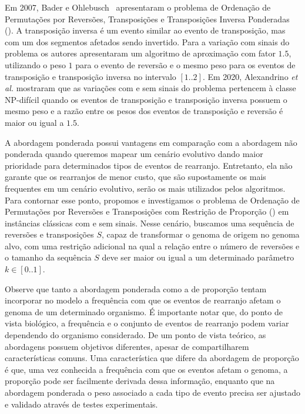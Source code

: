 Em 2007, Bader e Ohlebusch~\cite{2007-bader-ohlebusch} apresentaram o problema de Ordenação de Permutações por Reversões, Transposições e Transposições Inversa Ponderadas (\SbWRTIT). A transposição inversa é um evento similar ao evento de transposição, mas com um dos segmentos afetados sendo invertido. Para a variação com sinais do problema os autores apresentaram um algoritmo de aproximação com fator $1.5$, utilizando o peso $1$ para o evento de reversão e o mesmo peso para os eventos de transposição e transposição inversa no intervalo $[1..2]$. Em 2020, Alexandrino \textit{et al.}\cite{2020c-alexandrino-etal} mostraram que as variações com e sem sinais do problema \SbWRTIT{} pertencem à classe NP-difícil quando os eventos de transposição e transposição inversa possuem o mesmo peso e a razão entre os pesos dos eventos de transposição e reversão é maior ou igual a $1.5$.

A abordagem ponderada possui vantagens em comparação com a abordagem não ponderada quando queremos mapear um cenário evolutivo dando maior prioridade para determinados tipos de eventos de rearranjo. Entretanto, ela não garante que os rearranjos de menor custo, que são supostamente os mais frequentes em um cenário evolutivo, serão os mais utilizados pelos algoritmos. Para contornar esse ponto, propomos e investigamos o problema de Ordenação de Permutações por Reversões e Transposições com Restrição de Proporção (\SbPRT) em instâncias clássicas com e sem sinais. Nesse cenário, buscamos uma sequência de reversões e transposições $S$, capaz de transformar o genoma de origem no genoma alvo, com uma restrição adicional na qual a relação entre o número de reversões e o tamanho da sequência $S$ deve ser maior ou igual a um determinado parâmetro $k \in [0..1]$. 

Observe que tanto a abordagem ponderada como a de proporção tentam incorporar no modelo a frequência com que os eventos de rearranjo afetam o genoma de um determinado organismo. É importante notar que, do ponto de vista biológico, a frequência e o conjunto de eventos de rearranjo podem variar dependendo do organismo considerado. De um ponto de vista teórico, as abordagens possuem objetivos diferentes, apesar de compartilharem características comuns. Uma característica que difere da abordagem de proporção é que, uma vez conhecida a frequência com que os eventos afetam o genoma, a proporção pode ser facilmente derivada dessa informação, enquanto que na abordagem ponderada o peso associado a cada tipo de evento precisa ser ajustado e validado através de testes experimentais.

